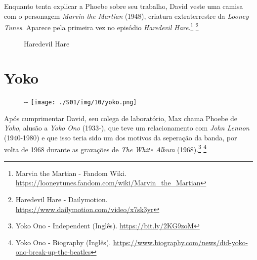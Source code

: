 \saveparinfos
\noindent
\begin{minipage}[c]{0.5\textwidth}\useparinfo

Enquanto tenta explicar a Phoebe sobre seu trabalho, David veste uma
camisa com o personagem \emph{Marvin the Martian} (1948), criatura
extraterrestre da \emph{Looney Tunes}. Aparece pela primeira vez no
episódio \emph{Haredevil Hare}.\footnote{\sloppy Marvin the Martian - Fandom Wiki. \url{https://looneytunes.fandom.com/wiki/Marvin_the_Martian}}
\footnote{\sloppy Haredevil Hare - Dailymotion. \url{https://www.dailymotion.com/video/x7sk3yr}}

\end{minipage}\hfill
\begin{minipage}[c]{0.5\textwidth}

\begin{figure}
  \centering
    \caption{Haredevil Hare\label{fig:haredevil-hare}}
\end{figure}

\end{minipage}

\hypertarget{yoko}{%
\section{Yoko}\label{yoko}}

\begin{figure}[!ht]
  \begin{adjustwidth}{-\oddsidemargin-1in}{-\rightmargin}
    \centering
    \texttt{[image: ./S01/img/10/yoko.png]}
  \end{adjustwidth}
\end{figure}

Após cumprimentar David, seu colega de laboratório, Max chama Phoebe de
\emph{Yoko}, alusão a \emph{Yoko Ono} (1933-), que teve um
relacionamento com \emph{John Lennon} (1940-1980) e que isso teria sido
um dos motivos da seperação da banda, por volta de 1968 durante as
gravações de \emph{The White Album} (1968).\footnote{\sloppy Yoko Ono - Independent (Inglês). \url{https://bit.ly/2KG9zoM}}
\footnote{\sloppy Yoko Ono - Biography (Inglês). \url{https://www.biography.com/news/did-yoko-ono-break-up-the-beatles}}

